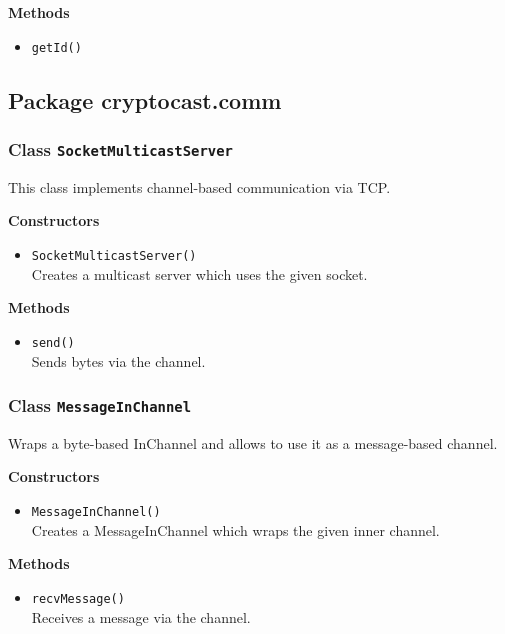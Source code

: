\textbf{Methods}
\begin{itemize}
\item \lstinline|getId()| \\


\end{itemize}


\subsection{Package cryptocast.comm}
\subsubsection{Class \lstinline|SocketMulticastServer|}
This class implements channel-based communication via TCP.

\textbf{Constructors}
\begin{itemize}
\item \lstinline|SocketMulticastServer()| \\
Creates a multicast server which uses the given socket.

\end{itemize}

\textbf{Methods}
\begin{itemize}
\item \lstinline|send()| \\
Sends bytes via the channel.

\end{itemize}

\subsubsection{Class \lstinline|MessageInChannel|}
Wraps a byte-based InChannel and allows to use it as a message-based
 channel.

\textbf{Constructors}
\begin{itemize}
\item \lstinline|MessageInChannel()| \\
Creates a MessageInChannel which wraps the given inner channel.

\end{itemize}

\textbf{Methods}
\begin{itemize}
\item \lstinline|recvMessage()| \\
Receives a message via the channel.

\end{itemize}

